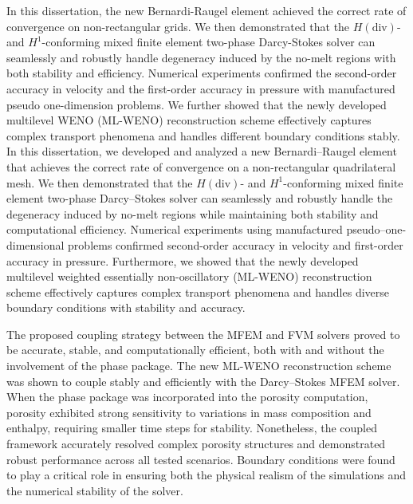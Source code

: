 In this dissertation,
the new Bernardi-Raugel element achieved the correct rate of convergence on non-rectangular grids.
We then demonstrated that the $H(\text{div})$- and $H^1$-conforming mixed finite element 
two-phase Darcy-Stokes solver can seamlessly 
and robustly handle degeneracy induced by the no-melt regions with both stability and efficiency.
Numerical experiments confirmed the second-order accuracy in velocity and the first-order accuracy in pressure
with manufactured pseudo one-dimension problems. 
We further showed that the newly developed multilevel WENO (ML-WENO) reconstruction scheme effectively 
captures complex transport phenomena and handles different boundary conditions stably. 
\fi
In this dissertation, we developed and analyzed a new Bernardi–Raugel element that achieves the correct 
rate of convergence on a non-rectangular quadrilateral mesh. We then demonstrated that the $H(\text{div})$- and $H^1$-conforming 
mixed finite element two-phase Darcy–Stokes solver can seamlessly and robustly handle the degeneracy induced by no-melt regions 
while maintaining both stability and computational efficiency. Numerical experiments using manufactured pseudo–one-dimensional 
problems confirmed second-order accuracy in velocity and first-order accuracy in pressure. Furthermore, we showed that the newly 
developed multilevel weighted essentially non-oscillatory (ML-WENO) reconstruction scheme 
effectively captures complex transport phenomena and handles diverse boundary conditions with stability and accuracy.

The proposed coupling strategy between the MFEM and FVM solvers proved to be accurate, stable, and computationally efficient, 
both with and without the involvement of the phase package. The new ML-WENO reconstruction scheme was shown to couple stably 
and efficiently with the Darcy–Stokes MFEM solver. When the phase package was incorporated into the porosity computation, porosity 
exhibited strong sensitivity to variations in mass composition and enthalpy, requiring smaller time steps for stability. 
Nonetheless, the coupled framework accurately resolved complex porosity structures and demonstrated robust performance across 
all tested scenarios. Boundary conditions were found to play a critical role in ensuring both the physical realism of the 
simulations and the numerical stability of the solver.

